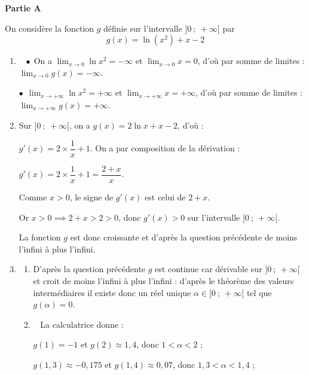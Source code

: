 
\medskip

\textbf{Partie A}

\medskip

On considère la fonction $g$ définie sur l'intervalle $]0~;~+\infty[$ par
\[g(x) = \ln \left(x^2\right) + x - 2\]
\begin{enumerate}
\item ~%
$\bullet~~$On a $\displaystyle\lim_{x \to 0} \ln x^2 = - \infty$ et $\displaystyle\lim_{x \to 0} x = 0$, d'où par somme de limites : $\displaystyle\lim_{x \to 0} g(x) = - \infty$.

$\bullet~~$$\displaystyle\lim_{x \to + \infty} \ln x^2  = + \infty$ et $\displaystyle\lim_{x \to + \infty} x  = + \infty$, d'où  par somme de limites : $\displaystyle\lim_{x \to + \infty} g(x) = + \infty$.
\item %

Sur $]0~;~+\infty[$, on a $g(x) = 2\ln x + x - 2$, d'où :

$g'(x) = 2\times \dfrac1x + 1$.
On a par composition de la dérivation :

$g'(x) = 2 \times \dfrac1x + 1 = \dfrac{2 + x}{x}$.

Comme $x > 0$, le signe de $g'(x)$ est celui de $2 + x$.

Or $x > 0 \implies 2 + x > 2 > 0$, donc $g'(x) > 0$ sur l'intervalle $]0~;~+\infty[$.

La fonction $g$ est donc croissante et d'après la question précédente de moins l'infini à plus l'infini.
\item \begin{enumerate}
\item %
D'après la question précédente $g$ est continue car dérivable sur $]0~;~+\infty[$ et croit de moins l'infini à plus l'infini : d'après le théorème des valeurs intermédiaires il existe donc un réel unique $\alpha \in ]0~;~+\infty[$ tel que $g(\alpha) = 0$.
\item ~%
La calculatrice donne :

$g(1) = - 1$ et $g(2) \approx1,4$, donc $1 < \alpha < 2$ ;

$g(1,3) \approx - 0,175$ et $g(1,4) \approx 0,07$, donc $1,3 < \alpha < 1,4$ ;


\end{enumerate}
\end{enumerate}

